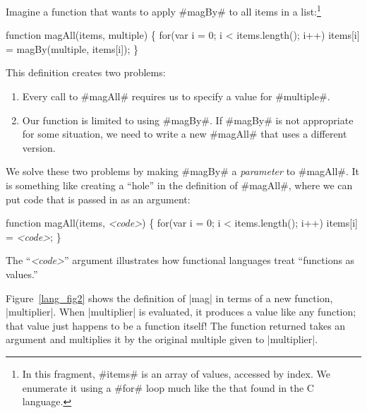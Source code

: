 \documentclass[12pt]{report}
\begin{document}
Imagine a function that wants to apply #magBy# to all items in a
list:\footnote{In this fragment, #items# is an array of values,
  accessed by index. We enumerate it using a #for# loop much like the
  that found in the C language.}
\begin{AVerb}
function magAll(items, multiple) \{
  for(var i = 0; i < items.length(); i++)
    items[i] = magBy(multiple, items[i]);
\}
\end{AVerb}
This definition creates two problems:
\begin{enumerate}
\item Every call to #magAll# requires us to specify a value for
  #multiple#.
\item Our function is limited to using #magBy#. If #magBy#
  is not appropriate for some situation, we need to write a new
  #magAll# that uses a different version.
\end{enumerate}
We solve these two problems by making #magBy# a \emph{parameter}
to #magAll#. It is something like creating a ``hole'' in the
definition of #magAll#, where we can put code that is passed in as
an argument:
\begin{AVerb}
function magAll(items, \emph{<code>}) \{
  for(var i = 0; i < items.length(); i++)
    items[i] = \emph{<code>};
\}
\end{AVerb}
The ``\emph{<code>}'' argument illustrates how functional languages
treat ``functions as values.''

Figure~\ref{lang_fig2} shows the definition of |mag| in terms of a
new function, |multiplier|.  When |multiplier| is evaluated, it
produces a value like any function; that value just happens to be a
function itself! The function returned takes an argument and
multiplies it by the original multiple given to |multiplier|.
\end{document}

